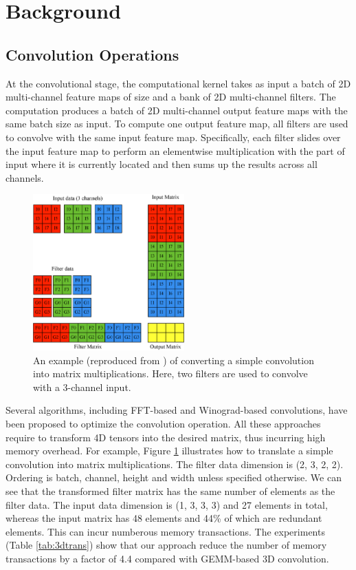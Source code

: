 
\section{Background}

\subsection{Convolution Operations}

At the convolutional stage, {\color{red}the computational kernel takes as input a batch of 2D multi-channel feature maps of size and a bank of  2D multi-channel filters. The computation produces a batch of 2D multi-channel output feature maps with the same batch size as input.} To compute one output feature map, all filters are used to convolve with the same input feature map. Specifically, each filter slides over the input feature map to perform an elementwise multiplication with the part of input where it is currently located and then sums up the results across all channels.

\begin{figure}
\centering
  \includegraphics[width=0.75\columnwidth,height=6cm]{./figure/convlowering.eps}
  \caption{An example (reproduced from \cite{ChetlurWVCTCS14}) of converting a simple convolution into matrix multiplications. Here, two filters are used to convolve with a 3-channel input.}
  \label{fig:convlowering}
\end{figure}

{\color{red}Several algorithms, including FFT-based and Winograd-based convolutions, have been proposed to optimize the convolution operation. All these approaches require to transform 4D tensors into the desired matrix, thus incurring high memory overhead. For example, Figure \ref{fig:convlowering} illustrates how to translate a simple convolution into matrix multiplications. The filter data dimension is (2, 3, 2, 2). Ordering is batch, channel, height and width unless specified otherwise. We can see that the transformed filter matrix has the same number of elements as the filter data. The input data dimension is (1, 3, 3, 3) and 27 elements in total, whereas the input matrix has 48 elements and 44\% of which are redundant elements. This can incur numberous memory transactions. The experiments (Table \ref{tab:3dtrans}) show that our approach reduce the number of memory transactions by a factor of 4.4 compared with GEMM-based 3D convolution.}

